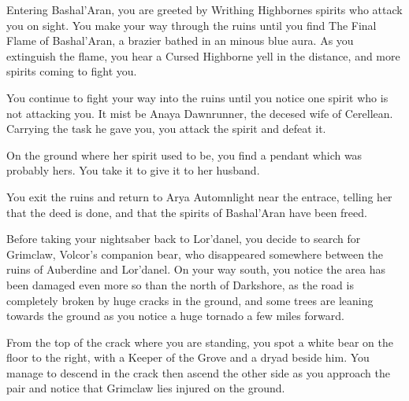 
Entering Bashal'Aran, you are greeted by Writhing Highbornes spirits who attack you on sight. You make your way through the ruins until you find The Final Flame of Bashal'Aran, a brazier bathed in an minous blue aura. As you extinguish the flame, you hear a Cursed Highborne yell in the distance, and more spirits coming to fight you.


You continue to fight your way into the ruins until you notice one spirit who is not attacking you. It mist be Anaya Dawnrunner, the decesed wife of Cerellean. Carrying the task he gave you, you attack the spirit and defeat it.


On the ground where her spirit used to be, you find a pendant which was probably hers. You take it to give it to her husband.

You exit the ruins and return to Arya Automnlight near the entrace, telling her that the deed is done, and that the spirits of Bashal'Aran have been freed.


Before taking your nightsaber back to Lor'danel, you decide to search for Grimclaw, Volcor's companion bear, who disappeared somewhere between the ruins of Auberdine and Lor'danel. On your way south, you notice the area has been damaged even more so than the north of Darkshore, as the road is completely broken by huge cracks in the ground, and some trees are leaning towards the ground as you notice a huge tornado a few miles forward.

From the top of the crack where you are standing, you spot a white bear on the floor to the right, with a Keeper of the Grove and a dryad beside him. You manage to descend in the crack then ascend the other side as you approach the pair and notice that Grimclaw lies injured on the ground.







